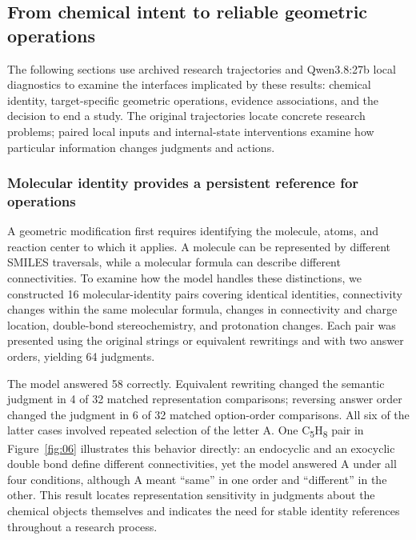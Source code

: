 














\subsection{From chemical intent to reliable geometric operations}


The following sections use archived research trajectories and Qwen3.8:27b local diagnostics to examine the interfaces implicated by these results: chemical identity, target-specific geometric operations, evidence associations, and the decision to end a study. The original trajectories locate concrete research problems; paired local inputs and internal-state interventions examine how particular information changes judgments and actions.

\subsubsection{Molecular identity provides a persistent reference for operations}



A geometric modification first requires identifying the molecule, atoms, and reaction center to which it applies. A molecule can be represented by different SMILES traversals, while a molecular formula can describe different connectivities. To examine how the model handles these distinctions, we constructed 16 molecular-identity pairs covering identical identities, connectivity changes within the same molecular formula, changes in connectivity and charge location, double-bond stereochemistry, and protonation changes. Each pair was presented using the original strings or equivalent rewritings and with two answer orders, yielding 64 judgments.



The model answered 58 correctly. Equivalent rewriting changed the semantic judgment in 4 of 32 matched representation comparisons; reversing answer order changed the judgment in 6 of 32 matched option-order comparisons. All six of the latter cases involved repeated selection of the letter A. One C\textsubscript{5}H\textsubscript{8} pair in Figure~\ref{fig:06} illustrates this behavior directly: an endocyclic and an exocyclic double bond define different connectivities, yet the model answered A under all four conditions, although A meant “same” in one order and “different” in the other. This result locates representation sensitivity in judgments about the chemical objects themselves and indicates the need for stable identity references throughout a research process.

